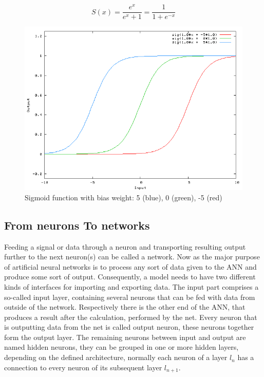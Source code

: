 \begin{equation}
\label{eqn:sigmoid}
S(x) = \frac{e^x}{e^x + 1} = \frac{1}{1 + e^{-x}}
\end{equation} 


\begin{figure}[H]
	\centering
	\includegraphics[width=\textwidth]{images/sigmoid.png}
	\caption{Sigmoid function with bias weight: 5 (blue), 0 (green), -5 (red)\protect\footnotemark}
	\label{fig:sigmoid}
\end{figure}


\subsection{From neurons To networks}
Feeding a signal or data through a neuron and transporting resulting output further to the next neuron(s) can be called a network. Now as the major purpose of artificial neural networks is to process any sort of data given to the ANN and produce some sort of output. Consequently, a model needs to have two different kinds of interfaces for importing and exporting data. \newline
The input part comprises a so-called input layer, containing several neurons that can be fed with data from outside of the network. Respectively there is the other end of the ANN, that produces a result after the calculation, performed by the net. Every neuron that is outputting data from the net is called output neuron, these neurons together form the output layer. The remaining neurons between input and output are named hidden neurons, they can be grouped in one or more hidden layers, depending on the defined architecture, normally each neuron of a layer $l_{n}$ has a connection to every neuron of its subsequent layer $l_{n+1}$.

